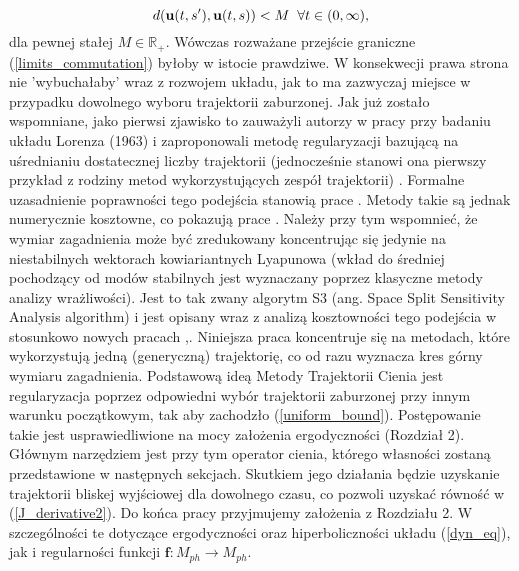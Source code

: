 \documentclass[12pt, twoside]{book}
\begin{document}
\begin{equation}
d(\textbf{u}(t,s'),\textbf{u}(t,s)) < M \thickspace \thickspace \forall t\in(0,\infty),
\label{uniform_bound}
\end{equation}
dla pewnej stałej $ M \in \mathbb{R}_{+} $. Wówczas rozważane przejście graniczne (\ref{limits_commutation}) byłoby w istocie prawdziwe. W konsekwecji prawa strona nie 'wybuchałaby' wraz z rozwojem układu, jak to ma zazwyczaj miejsce w przypadku dowolnego wyboru trajektorii zaburzonej.
Jak już zostało wspomniane, jako pierwsi zjawisko to zauważyli autorzy w pracy \cite{Lea1} przy badaniu układu Lorenza (1963) i zaproponowali metodę regularyzacji bazującą na uśrednianiu dostatecznej liczby trajektorii (jednocześnie stanowi ona pierwszy przykład z rodziny metod wykorzystujących zespół trajektorii) \cite{Lea2}. Formalne uzasadnienie poprawności tego podejścia stanowią prace \cite{Ruelle1} . Metody takie są jednak numerycznie kosztowne, co pokazują prace \cite{Chandramoorthy}. Należy przy tym wspomnieć, że wymiar zagadnienia może być zredukowany koncentrując się jedynie na niestabilnych wektorach kowiariantnych Lyapunowa (wkład do średniej pochodzący od modów stabilnych jest wyznaczany poprzez klasyczne metody analizy wrażliwości). Jest to tak zwany algorytm S3 (ang. Space Split Sensitivity Analysis algorithm) i jest opisany wraz z analizą kosztowności tego podejścia w stosunkowo nowych pracach \cite{Chandramoorthy2},\cite{Chandramoorthy3}. Niniejsza praca koncentruje się na metodach, które wykorzystują jedną (generyczną) trajektorię, co od razu wyznacza kres górny wymiaru zagadnienia.\newline 
Podstawową ideą Metody Trajektorii Cienia jest regularyzacja poprzez odpowiedni wybór trajektorii zaburzonej przy innym warunku początkowym, tak aby zachodzło (\ref{uniform_bound}). Postępowanie takie jest usprawiedliwione na mocy założenia ergodyczności (Rozdział 2). Głównym narzędziem jest przy tym operator cienia, którego własności zostaną przedstawione w następnych sekcjach. Skutkiem jego działania będzie uzyskanie trajektorii bliskej wyjściowej dla dowolnego czasu, co pozwoli uzyskać równość w (\ref{J_derivative2}). \newline 
Do końca pracy przyjmujemy założenia z Rozdziału 2. W szczególności te dotyczące ergodyczności oraz hiperboliczności układu (\ref{dyn_eq}), jak i regularności funkcji $ \textbf{f}: M_{ph} \rightarrow M_{ph}$. 
\end{document}
